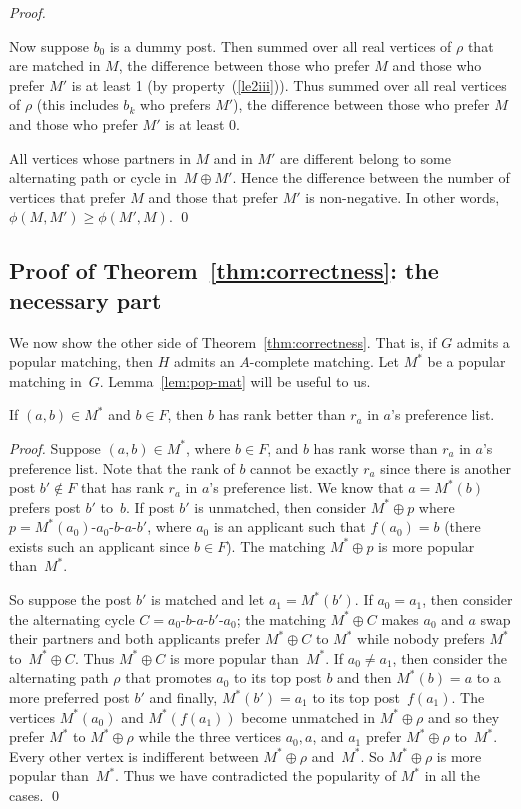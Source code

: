 \documentclass[11pt]{llncs}
\begin{document}
\begin{proof}
\begin{itemize}
Now suppose $b_0$ is a dummy post.  Then summed over all real vertices of $\rho$ that are matched in $M$, the difference between those 
who prefer $M$ and those who prefer $M'$ is at least 1 (by property~(\ref{le2iii})). Thus summed over all real vertices of $\rho$ 
(this includes $b_k$ who prefers $M'$), the difference between those who prefer $M$ and those who prefer $M'$ is at least 0.
\end{itemize}
All vertices whose partners in $M$ and in $M'$ are different belong to some alternating path or cycle in~$M \oplus M'$. Hence 
the difference between the number of vertices that prefer $M$ and those that prefer $M'$ is non-negative. In other words, 
$\phi(M,M') \ge \phi(M',M)$. \qed
\end{proof}



\subsection{Proof of Theorem~\ref{thm:correctness}: the necessary part}
We now show the other side of Theorem~\ref{thm:correctness}. That is, if $G$ admits a popular 
matching, then $H$ admits an $A$-complete matching. Let $M^*$ be a popular matching in~$G$. 
Lemma~\ref{lem:pop-mat} will be useful to us.
\begin{lemma}
\label{lem:pop-mat}
If $(a,b) \in M^*$ and $b \in F$, then $b$ has rank better than $r_a$ in $a$'s preference list.
\end{lemma}
\begin{proof}
Suppose $(a,b) \in M^*$, where $b \in F$, and $b$ has rank worse than $r_a$ in $a$'s preference list. Note that the rank of $b$ cannot be exactly $r_a$ since there is another 
post $b' \notin F$ that has rank $r_a$ in $a$'s preference list. We know that $a = M^*(b)$ prefers post 
$b'$ to~$b$. If post $b'$ is unmatched, then consider $M^* \oplus p$ where $p = M^*(a_0)$-$a_0$-$b$-$a$-$b'$, where $a_0$ is an applicant such that $f(a_0) = b$ (there exists such an applicant since $b \in F$). The matching $M^* \oplus p$ is more popular than~$M^*$. 

So suppose the post $b'$ is matched and let $a_1 = M^*(b')$. If $a_0 = a_1$, then consider the alternating cycle 
$C = a_0$-$b$-$a$-$b'$-$a_0$; the matching $M^* \oplus C$ makes $a_0$ and $a$ swap their partners and both applicants prefer
$M^* \oplus C$ to $M^*$ while nobody prefers $M^*$ to~$M^* \oplus C$. Thus $M^* \oplus C$ is more popular than~$M^*$.
If $a_0 \ne a_1$, then consider the alternating path $\rho$ that promotes $a_0$ to its top post $b$ and then $M^*(b) = a$ to a more 
preferred post $b'$ and finally, $M^*(b') = a_1$ to its top post~$f(a_1)$.
The vertices $M^*(a_0)$ and $M^*(f(a_1))$ become unmatched in $M^*\oplus\rho$ and so they prefer $M^*$ 
to  $M^*\oplus\rho$ while the three vertices $a_0,a$, and $a_1$  prefer $M^*\oplus\rho$ to~$M^*$. 
Every other vertex is indifferent between $M^*\oplus\rho$ and~$M^*$.
So $M^*\oplus\rho$ is more popular than~$M^*$. Thus we have contradicted the popularity of $M^*$ in all the cases. \qed
\end{proof}
\end{document}
